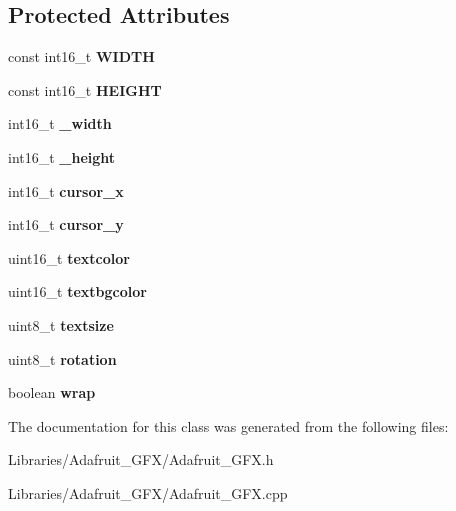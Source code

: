 \subsection*{Protected Attributes}
\begin{DoxyCompactItemize}
\item 
\hypertarget{class_adafruit___g_f_x_ab693a8ac5d94c50c2558b5a3795ddde4}{}const int16\+\_\+t {\bfseries W\+I\+D\+T\+H}\label{class_adafruit___g_f_x_ab693a8ac5d94c50c2558b5a3795ddde4}

\item 
\hypertarget{class_adafruit___g_f_x_a6b3665babcb73df381563016e9f71bdb}{}const int16\+\_\+t {\bfseries H\+E\+I\+G\+H\+T}\label{class_adafruit___g_f_x_a6b3665babcb73df381563016e9f71bdb}

\item 
\hypertarget{class_adafruit___g_f_x_ab237f850a033492f5e745d79405a097a}{}int16\+\_\+t {\bfseries \+\_\+width}\label{class_adafruit___g_f_x_ab237f850a033492f5e745d79405a097a}

\item 
\hypertarget{class_adafruit___g_f_x_ab9bb0cbc2455f64dce2a5ec36307aa94}{}int16\+\_\+t {\bfseries \+\_\+height}\label{class_adafruit___g_f_x_ab9bb0cbc2455f64dce2a5ec36307aa94}

\item 
\hypertarget{class_adafruit___g_f_x_a8f8983cea8d81a7c8e9d05eef36318e2}{}int16\+\_\+t {\bfseries cursor\+\_\+x}\label{class_adafruit___g_f_x_a8f8983cea8d81a7c8e9d05eef36318e2}

\item 
\hypertarget{class_adafruit___g_f_x_aebe0a38f6e6fd59cb81620c4696286c9}{}int16\+\_\+t {\bfseries cursor\+\_\+y}\label{class_adafruit___g_f_x_aebe0a38f6e6fd59cb81620c4696286c9}

\item 
\hypertarget{class_adafruit___g_f_x_a8c6d23a386651136fd9530a5b7046591}{}uint16\+\_\+t {\bfseries textcolor}\label{class_adafruit___g_f_x_a8c6d23a386651136fd9530a5b7046591}

\item 
\hypertarget{class_adafruit___g_f_x_a23e7a4efcab0b1588dc0cafa14b1fac1}{}uint16\+\_\+t {\bfseries textbgcolor}\label{class_adafruit___g_f_x_a23e7a4efcab0b1588dc0cafa14b1fac1}

\item 
\hypertarget{class_adafruit___g_f_x_ac293848b8fe8c46107d1a491f6a5168d}{}uint8\+\_\+t {\bfseries textsize}\label{class_adafruit___g_f_x_ac293848b8fe8c46107d1a491f6a5168d}

\item 
\hypertarget{class_adafruit___g_f_x_a37a479d28fb11906ce516e983b1af926}{}uint8\+\_\+t {\bfseries rotation}\label{class_adafruit___g_f_x_a37a479d28fb11906ce516e983b1af926}

\item 
\hypertarget{class_adafruit___g_f_x_ad6bd603e01861212829d536312a7190b}{}boolean {\bfseries wrap}\label{class_adafruit___g_f_x_ad6bd603e01861212829d536312a7190b}

\end{DoxyCompactItemize}


The documentation for this class was generated from the following files\+:\begin{DoxyCompactItemize}
\item 
Libraries/\+Adafruit\+\_\+\+G\+F\+X/Adafruit\+\_\+\+G\+F\+X.\+h\item 
Libraries/\+Adafruit\+\_\+\+G\+F\+X/Adafruit\+\_\+\+G\+F\+X.\+cpp\end{DoxyCompactItemize}
